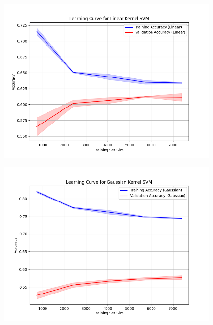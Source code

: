 \documentclass[11pt,a4paper]{article}
\begin{document}
\begin{figure}[t]
  \centering
  \begin{minipage}{0.3\textwidth}
      \centering
      \includegraphics[width=\textwidth]{images/learning_curve_linear_SVM.png}
      \label{fig:linear_SVM_curve}
  \end{minipage}%
  \begin{minipage}{0.3\textwidth}
      \centering
      \includegraphics[width=\textwidth]{images/learning_curve_gaussian_SVM.png}
      \label{fig:gaussian_SVM_curve}
  \end{minipage}%
  \begin{minipage}{0.3\textwidth}
      \centering

\end{minipage}
\end{figure}
\end{document}
